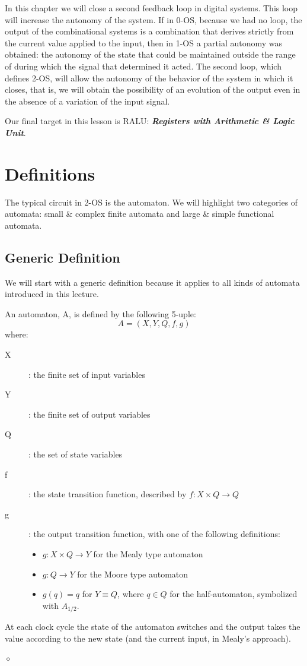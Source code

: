 In this chapter we will close a second feedback loop in digital systems. This loop will increase the autonomy of the system. If in 0-OS, because we had no loop, the output of the combinational systems is a combination that derives strictly from the current value applied to the input, then in 1-OS a partial autonomy was obtained: the autonomy of the state that could be maintained outside the range of during which the signal that determined it acted. The second loop, which defines 2-OS, will allow the autonomy of the behavior of the system in which it closes, that is, we will obtain the possibility of an evolution of the output even in the absence of a variation of the input signal.

Our final target in this lesson is RALU: {\bf {\em Registers with Arithmetic \& Logic Unit}}.

\section{Definitions}

The typical circuit in 2-OS is the automaton. We will highlight two categories of automata: small \& complex finite automata and large \& simple functional automata.

\subsection{Generic Definition}

We will start with a generic definition because it applies to all kinds of automata introduced in this lecture.

\begin{definition}
An automaton, A, is defined by the following 5-uple:
$$A=(X, Y, Q, f, g)$$
where:
\begin{description}
\item[X]: the finite set of input variables \item[Y]: the finite
set of output variables \item[Q]: the set of state variables
\item[f]: the state transition function, described by $f:X \times
Q \rightarrow Q$ \item[g]: the output transition function,  with
one of the  following  definitions:
\begin{itemize}
    \item $g:X \times Q \rightarrow Y$ for the Mealy type automaton
    \item $g:Q \rightarrow Y$ for the Moore type automaton
    \item $g(q)=q$ for $Y \equiv Q$, where $q \in Q$ for the half-automaton, symbolized with $A_{1/2}$.
\end{itemize}
\end{description}
At each clock cycle the state of the automaton  switches and the
output takes the value according to the new state (and the current
input, in Mealy's approach).

$\diamond$
\end{definition}

